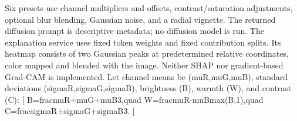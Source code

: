 \documentclass[conference]{IEEEtran}
\begin{document}
{} Six presets use channel multipliers and offsets, contrast/saturation adjustments, optional blur blending, Gaussian noise, and a radial vignette. The returned diffusion prompt is descriptive metadata; no diffusion model is run. The explanation service uses fixed token weights and fixed contribution splits. Its heatmap consists of two Gaussian peaks at predetermined relative coordinates, color mapped and blended with the image. Neither SHAP nor gradient-based Grad-CAM is implemented.\markdownRendererInterblockSeparator
{}
\markdownRendererSectionEnd \markdownRendererSectionBegin
{}\markdownRendererInterblockSeparator
{}Let channel means be (\markdownRendererBackslash{}mu\markdownRendererUnderscore{}R,\markdownRendererBackslash{}mu\markdownRendererUnderscore{}G,\markdownRendererBackslash{}mu\markdownRendererUnderscore{}B), standard deviations (\markdownRendererBackslash{}sigma\markdownRendererUnderscore{}R,\markdownRendererBackslash{}sigma\markdownRendererUnderscore{}G,\markdownRendererBackslash{}sigma\markdownRendererUnderscore{}B), brightness (B), warmth (W), and contrast (C):\markdownRendererParagraphSeparator
{}[\markdownRendererSoftLineBreak
{}B=\markdownRendererBackslash{}frac\markdownRendererLeftBrace{}\markdownRendererBackslash{}mu\markdownRendererUnderscore{}R+\markdownRendererBackslash{}mu\markdownRendererUnderscore{}G+\markdownRendererBackslash{}mu\markdownRendererUnderscore{}B\markdownRendererRightBrace{}\markdownRendererLeftBrace{}3\markdownRendererRightBrace{},\markdownRendererBackslash{}quad\markdownRendererSoftLineBreak
{}W=\markdownRendererBackslash{}frac\markdownRendererLeftBrace{}\markdownRendererBackslash{}mu\markdownRendererUnderscore{}R-\markdownRendererBackslash{}mu\markdownRendererUnderscore{}B\markdownRendererRightBrace{}\markdownRendererLeftBrace{}\markdownRendererBackslash{}max(B,1)\markdownRendererRightBrace{},\markdownRendererBackslash{}quad\markdownRendererSoftLineBreak
{}C=\markdownRendererBackslash{}frac\markdownRendererLeftBrace{}\markdownRendererBackslash{}sigma\markdownRendererUnderscore{}R+\markdownRendererBackslash{}sigma\markdownRendererUnderscore{}G+\markdownRendererBackslash{}sigma\markdownRendererUnderscore{}B\markdownRendererRightBrace{}\markdownRendererLeftBrace{}3\markdownRendererRightBrace{}.\markdownRendererSoftLineBreak
{}]\markdownRendererParagraphSeparator
\end{document}
